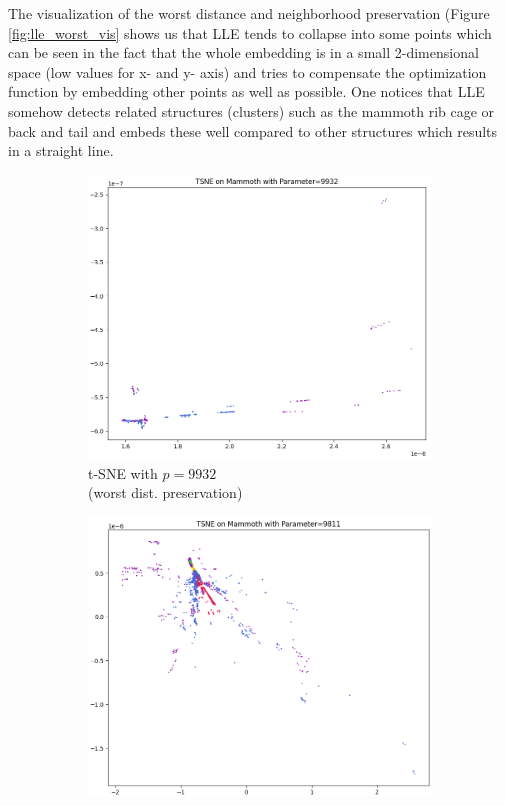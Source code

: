 The visualization of the worst distance and neighborhood preservation (Figure \ref{fig:lle_worst_vis} shows us that LLE tends to collapse into some points which can be seen in the fact that the whole embedding is in a small 2-dimensional space (low values for x- and y- axis) and tries to compensate the optimization function by embedding other points as well as possible. One notices that LLE somehow detects related structures (clusters) such as the mammoth rib cage or back and tail and embeds these well compared to other structures which results in a straight line.

\begin{figure}[!]
     \centering
     \begin{subfigure}[t]{0.49\columnwidth}
    	\centering
    	\includegraphics[width=\columnwidth]{images/mammoth_tsne9932_plot.png}
    	\caption{t-SNE with $p=9932$ \\ (worst dist. preservation)}
        \label{fig:mammoth_tsne9932_plot}
    \end{subfigure}
     \hfill
     \begin{subfigure}[t]{0.49\columnwidth}
    	\centering
    	\includegraphics[width=\columnwidth]{images/mammoth_tsne9811_plot.png}

\end{subfigure}
\end{figure}
